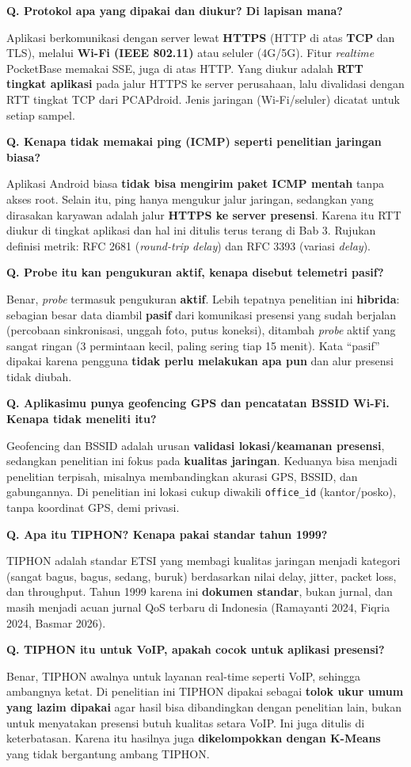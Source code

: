 \documentclass[11pt,a4paper]{article}
\newcounter{q}
\newcommand{\tanya}[2]{\stepcounter{q}%
\par\vspace{6pt}\noindent\colorbox{band}{\parbox{\dimexpr\linewidth-2\fboxsep}{\textbf{Q\arabic{q}. #1}}}\par\vspace{2pt}#2\par}
\begin{document}
\tanya{Protokol apa yang dipakai dan diukur? Di lapisan mana?}{Aplikasi berkomunikasi dengan server lewat \textbf{HTTPS} (HTTP di atas \textbf{TCP} dan TLS), melalui \textbf{Wi-Fi (IEEE 802.11)} atau seluler (4G/5G). Fitur \textit{realtime} PocketBase memakai SSE, juga di atas HTTP. Yang diukur adalah \textbf{RTT tingkat aplikasi} pada jalur HTTPS ke server perusahaan, lalu divalidasi dengan RTT tingkat TCP dari PCAPdroid. Jenis jaringan (Wi-Fi/seluler) dicatat untuk setiap sampel.}

\tanya{Kenapa tidak memakai ping (ICMP) seperti penelitian jaringan biasa?}{Aplikasi Android biasa \textbf{tidak bisa mengirim paket ICMP mentah} tanpa akses root. Selain itu, ping hanya mengukur jalur jaringan, sedangkan yang dirasakan karyawan adalah jalur \textbf{HTTPS ke server presensi}. Karena itu RTT diukur di tingkat aplikasi dan hal ini ditulis terus terang di Bab 3. Rujukan definisi metrik: RFC 2681 (\textit{round-trip delay}) dan RFC 3393 (variasi \textit{delay}).}

\tanya{Probe itu kan pengukuran aktif, kenapa disebut telemetri pasif?}{Benar, \textit{probe} termasuk pengukuran \textbf{aktif}. Lebih tepatnya penelitian ini \textbf{hibrida}: sebagian besar data diambil \textbf{pasif} dari komunikasi presensi yang sudah berjalan (percobaan sinkronisasi, unggah foto, putus koneksi), ditambah \textit{probe} aktif yang sangat ringan (3 permintaan kecil, paling sering tiap 15 menit). Kata ``pasif'' dipakai karena pengguna \textbf{tidak perlu melakukan apa pun} dan alur presensi tidak diubah.}

\tanya{Aplikasimu punya geofencing GPS dan pencatatan BSSID Wi-Fi. Kenapa tidak meneliti itu?}{Geofencing dan BSSID adalah urusan \textbf{validasi lokasi/keamanan presensi}, sedangkan penelitian ini fokus pada \textbf{kualitas jaringan}. Keduanya bisa menjadi penelitian terpisah, misalnya membandingkan akurasi GPS, BSSID, dan gabungannya. Di penelitian ini lokasi cukup diwakili \texttt{office\_id} (kantor/posko), tanpa koordinat GPS, demi privasi.}

\tanya{Apa itu TIPHON? Kenapa pakai standar tahun 1999?}{TIPHON adalah standar ETSI yang membagi kualitas jaringan menjadi kategori (sangat bagus, bagus, sedang, buruk) berdasarkan nilai delay, jitter, packet loss, dan throughput. Tahun 1999 karena ini \textbf{dokumen standar}, bukan jurnal, dan masih menjadi acuan jurnal QoS terbaru di Indonesia (Ramayanti 2024, Fiqria 2024, Basmar 2026).}

\tanya{TIPHON itu untuk VoIP, apakah cocok untuk aplikasi presensi?}{Benar, TIPHON awalnya untuk layanan real-time seperti VoIP, sehingga ambangnya ketat. Di penelitian ini TIPHON dipakai sebagai \textbf{tolok ukur umum yang lazim dipakai} agar hasil bisa dibandingkan dengan penelitian lain, bukan untuk menyatakan presensi butuh kualitas setara VoIP. Ini juga ditulis di keterbatasan. Karena itu hasilnya juga \textbf{dikelompokkan dengan K-Means} yang tidak bergantung ambang TIPHON.}
\end{document}
